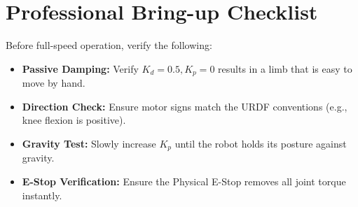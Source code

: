 \documentclass[11pt,a4paper]{article}
\begin{document}
\section{Professional Bring-up Checklist}
Before full-speed operation, verify the following:
\begin{itemize}
    \item[$\square$] \textbf{Passive Damping:} Verify $K_d = 0.5, K_p = 0$ results in a limb that is easy to move by hand.
    \item[$\square$] \textbf{Direction Check:} Ensure motor signs match the URDF conventions (e.g., knee flexion is positive).
    \item[$\square$] \textbf{Gravity Test:} Slowly increase $K_p$ until the robot holds its posture against gravity.
    \item[$\square$] \textbf{E-Stop Verification:} Ensure the Physical E-Stop removes all joint torque instantly.
\end{itemize}
\end{document}
